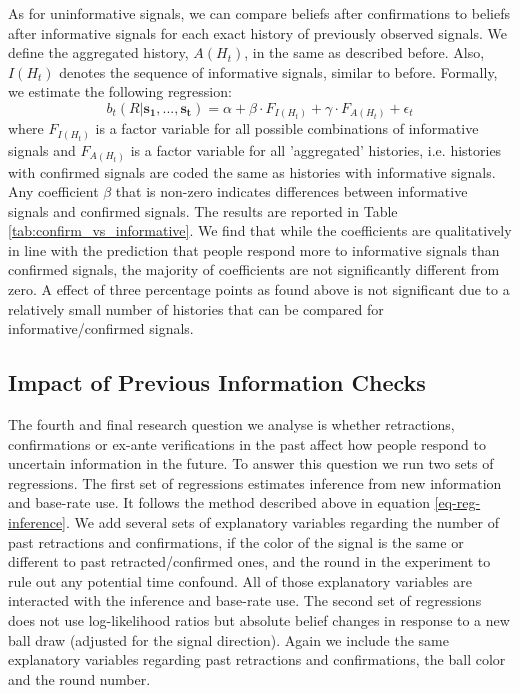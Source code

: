 \documentclass{article}
\begin{document}
As for uninformative signals, we can compare beliefs after confirmations to beliefs after informative signals for each exact history of previously observed signals. We define the aggregated history, $A(H_t)$, in the same as described before. Also, $I(H_t)$ denotes the sequence of informative signals, similar to before. Formally, we estimate the following regression:
\begin{equation}
    b_t(R|\mathbf{s_1},...,\mathbf{s_t})=\alpha + \beta \cdot F_{I(H_t)} + \gamma \cdot F_{A(H_t)} + \epsilon_t
\end{equation}
where $F_{I(H_t)}$ is a factor variable for all possible combinations of informative signals and $F_{A(H_t)}$ is a factor variable for all 'aggregated' histories, i.e.  histories with confirmed signals are coded the same as histories with informative signals. Any coefficient $\beta$ that is non-zero indicates differences between informative signals and confirmed signals. The results are reported in Table \ref{tab:confirm_vs_informative}. We find that while the coefficients are qualitatively in line with the prediction that people respond more to informative signals than confirmed signals, the majority of coefficients are not significantly different from zero. A effect of three percentage points as found above is not significant due to a relatively small number of histories that can be compared for informative/confirmed signals.


\subsection{Impact of Previous Information Checks}

The fourth and final research question we analyse is whether retractions, confirmations or ex-ante verifications in the past affect how people respond to uncertain information in the future. To answer this question we run two sets of regressions. The first set of regressions estimates inference from new information and base-rate use. It follows the method described above in equation \ref{eq-reg-inference}. We add several sets of explanatory variables regarding the number of past retractions and confirmations, if the color of the signal is the same or different to past retracted/confirmed ones, and the round in the experiment to rule out any potential time confound. All of those explanatory variables are interacted with the inference and base-rate use. The second set of regressions does not use log-likelihood ratios but absolute belief changes in response to a new ball draw (adjusted for the signal direction). Again we include the same explanatory variables regarding past retractions and confirmations, the ball color and the round number.
\end{document}
